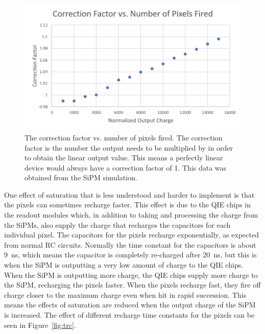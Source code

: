 \begin{figure}
\centering
\includegraphics[width=\linewidth]{Figures/CorFac.png}
\caption{The correction factor vs. number of pixels fired. The correction factor is the number the output needs to be multiplied by in order to obtain the linear output value. This means a perfectly linear device would always have a correction factor of 1. This data was obtained from the SiPM simulation.}
\label{fig:Cor}
\end{figure}

One effect of saturation that is less understood and harder to implement is that the pixels can sometimes recharge faster. This effect is due to the QIE chips in the readout modules which, in addition to taking and processing the charge from the SiPMs, also supply the charge that recharges the capacitors for each individual pixel. The capacitors for the pixels recharge exponentially, as expected from normal RC circuits. Normally the time constant for the capacitors is about 9~ns, which means the capacitor is completely re-charged after 20~ns, but this is when the SiPM is outputting a very low amount of charge to the QIE chips. When the SiPM is outputting more charge, the QIE chips supply more charge to the SiPM, recharging the pixels faster. When the pixels recharge fast, they fire off charge closer to the maximum charge even when hit in rapid succession. This means the effects of saturation are reduced when the output charge of the SiPM is increased. The effect of different recharge time constants for the pixels can be seen in Figure~\ref{fig:trc}.

